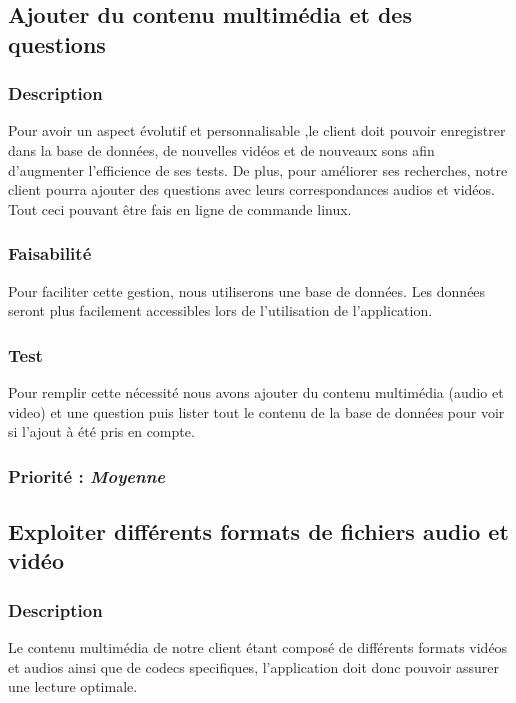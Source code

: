 \subsection{Ajouter du contenu multimédia et des questions}

\subsubsection{Description}
Pour avoir un aspect évolutif et personnalisable ,le client doit pouvoir enregistrer dans la base de données, de nouvelles vidéos et de nouveaux sons afin d’augmenter l’efficience de ses tests. De plus, pour améliorer ses recherches, notre client pourra ajouter des questions avec leurs correspondances audios et vidéos.
Tout ceci pouvant être fais en ligne de commande linux.

\subsubsection{Faisabilité}

Pour faciliter cette gestion, nous utiliserons une base de données. Les données seront plus facilement accessibles lors de l’utilisation de l’application.

\subsubsection{Test}

Pour remplir cette nécessité nous avons ajouter du contenu multimédia (audio et video) et une question puis lister tout le contenu de la base de données pour voir si l’ajout à été pris en compte.

\subsubsection{Priorité : \textit{Moyenne}}

\subsection{Exploiter différents formats de fichiers audio et vidéo}

\subsubsection{Description}

Le contenu multimédia de notre client étant composé de différents formats vidéos et audios ainsi que de codecs specifiques, l’application doit donc pouvoir assurer une lecture optimale.


